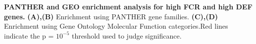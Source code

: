 \textbf{PANTHER and GEO enrichment analysis for high FCR and high DEF genes.}
\textbf{(A),(B)} Enrichment using PANTHER gene families. \textbf{(C),(D)} Enrichment using Gene Ontology Molecular Function categories.Red lines indicate the p = $10^{-5}$ threshold used to judge significance.